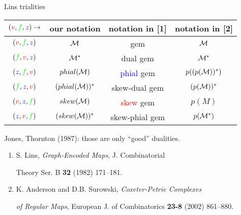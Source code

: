 \documentclass[%
pdf,
colorBG,
slideColor,
]{prosper}
\begin{document}
\begin{slide}{Lins trialities}
\begin{tabular}{||c|c|c|c||}
\hline
$(\textcolor{red}{v},\textcolor{green}{f},\textcolor{blue}{z})\rightarrow $   &our notation          &notation in [1]  &notation in [2]\\
\hline
$(\textcolor{red}{v},\textcolor{green}{f},\textcolor{blue}{z})$               &${\cal M}$            &gem                   &${\cal M}$\\  %
$(\textcolor{green}{f},\textcolor{red}{v},\textcolor{blue}{z})$               &${\cal M}^*$          &dual gem              &${\cal M}^*$\\  %
$(\textcolor{blue}{z},\textcolor{green}{f},\textcolor{red}{v})$               &$phial({\cal M})$     &\textcolor{blue}{phial} gem             &$p((p({\cal M}))^*)$\\  %
$(\textcolor{green}{f},\textcolor{blue}{z},\textcolor{red}{v})$               &$(phial({\cal M}))^*$ &skew-dual gem         &$(p({\cal M}))^*$\\  %
$(\textcolor{red}{v},\textcolor{blue}{z},\textcolor{green}{f})$               &$skew({\cal M})$      &\textcolor{red}{skew} gem              &$p(M)$\\  %
$(\textcolor{blue}{z},\textcolor{red}{v},\textcolor{green}{f})$               &$(skew({\cal M}))^*$  &skew-phial gem        &$p({\cal M}^*)$\\\hline  %
\end{tabular}
Jones, Thornton (1987): those are only ``good'' dualities.

{\scriptsize
\begin{enumerate}
\item S. Lins, {\em Graph-Encoded Maps}, J. Combinatorial

Theory Ser. B {\bf 32} (1982) 171--181.

\item K. Anderson and D.B. Surowski, {\em Coxeter-Petrie Complexes}

{\em of Regular Maps}, European J. of Combinatorics {\bf 23-8} (2002) 861--880.
\end{enumerate}
}


\end{slide}
\end{document}
